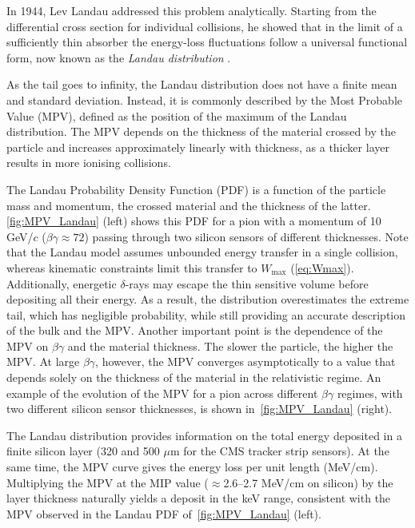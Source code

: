 In 1944, Lev Landau addressed this problem analytically. Starting from the differential cross section for individual collisions, he showed that in the limit of a sufficiently thin absorber the energy-loss fluctuations follow a universal functional form, now known as the \textit{Landau distribution} \cite{Landau}.

\vspace{0.5 cm}

As the tail goes to infinity, the Landau distribution does not have a finite mean and standard deviation. Instead, it is commonly described by the Most Probable Value (MPV), defined as the position of the maximum of the Landau distribution. The MPV depends on the thickness of the material crossed by the particle and increases approximately linearly with thickness, as a thicker layer results in more ionising collisions. 

The Landau Probability Density Function (PDF) is a function of the particle mass and momentum, the crossed material and the thickness of the latter. \cref{fig:MPV_Landau} (left) shows this PDF for a pion with a momentum of 10 GeV/$c$ ($\beta\gamma\approx72$) passing through two silicon sensors of different thicknesses. Note that the Landau model assumes unbounded energy transfer in a single collision, whereas kinematic constraints limit this transfer to $W_{\mathrm{max}}$ (\cref{eq:Wmax}). Additionally, energetic $\delta$-rays may escape the thin sensitive volume before depositing all their energy. As a result, the distribution overestimates the extreme tail, which has negligible probability, while still providing an accurate description of the bulk and the MPV. Another important point is the dependence of the MPV on $\beta\gamma$ and the material thickness. The slower the particle, the higher the MPV. At large $\beta\gamma$, however, the MPV converges asymptotically to a value that depends solely on the thickness of the material in the relativistic regime. An example of the evolution of the MPV for a pion across different $\beta\gamma$ regimes, with two different silicon sensor thicknesses, is shown in~\cref{fig:MPV_Landau} (right).

\vspace{0.5 cm}

The Landau distribution provides information on the total energy deposited in a finite silicon layer (320 and 500 $\mu\mathrm{m}$ for the CMS tracker strip sensors). At the same time, the MPV curve gives the energy loss per unit length (MeV/cm). Multiplying the MPV at the MIP value ($\approx$2.6--2.7 MeV/cm on silicon) by the layer thickness naturally yields a deposit in the keV range, consistent with the MPV observed in the Landau PDF of~\cref{fig:MPV_Landau} (left).

